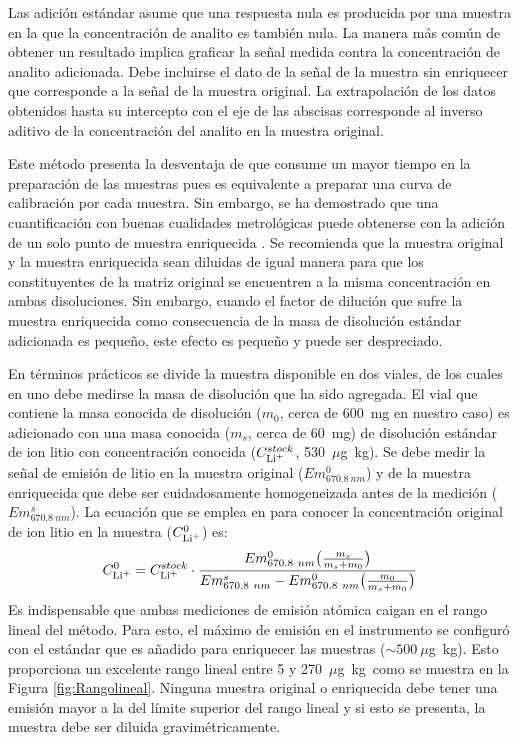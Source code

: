 Las adición estándar asume que una respuesta nula es producida por una muestra en la que la concentración de analito es también nula. La manera más común de obtener un resultado implica graficar la señal medida contra la concentración de analito adicionada. Debe incluirse el dato de la señal de la muestra sin enriquecer que corresponde a la señal de la muestra original. La extrapolación de los datos obtenidos hasta su intercepto con el eje de las abscisas corresponde al inverso aditivo de la concentración del analito en la muestra original.

Este método presenta la desventaja de que consume un mayor tiempo en la preparación de las muestras pues es equivalente a preparar una curva de calibración por cada muestra. Sin embargo, se ha demostrado que una cuantificación con buenas cualidades metrológicas puede obtenerse con la adición de un solo punto de muestra enriquecida \citep{Ellison2008}. Se recomienda que la muestra original y la muestra enriquecida sean diluidas de igual manera para que los constituyentes de la matriz original se encuentren a la misma concentración en ambas disoluciones. Sin embargo, cuando el factor de dilución que sufre la muestra enriquecida como consecuencia de la masa de disolución estándar adicionada es pequeño, este efecto es pequeño y puede ser despreciado.

En términos prácticos se divide la muestra disponible en dos viales, de los cuales en uno debe medirse la masa de disolución que ha sido agregada. El vial que contiene la masa conocida de disolución ($m_0$, cerca de 600~mg en nuestro caso) es adicionado con una masa conocida ($m_s$, cerca de 60~mg) de disolución estándar de ion litio con concentración conocida ($C_{\ce{Li+}}^{stock}$, 530~$\mu$g~kg\mnn). Se debe medir la señal de emisión de litio en la muestra original ($Em_{670.8~nm}^0$) y de la muestra enriquecida que debe ser cuidadosamente homogeneizada antes de la medición ($Em_{670.8~nm}^s$). La ecuación que se emplea en para conocer la concentración original de ion litio en la muestra ($C_{\ce{Li+}}^0$) es:
\begin{equation}
    C_{\ce{Li+}}^0 = C_{\ce{Li+}}^{stock} \cdot\frac{Em_{670.8~nm}^0  \big(\frac{m_s}{m_s+m_0}\big)} {Em_{670.8~nm}^s-Em_{670.8~nm}^0\big(\frac{m_0}{m_s+m_0}\big)}
\end{equation}
Es indispensable que ambas mediciones de emisión atómica caigan en el rango lineal del método. Para esto, el máximo de emisión en el instrumento se configuró con el estándar que es añadido para enriquecer las muestras ($\sim500~\mu$g~kg\mnn). Esto proporciona un excelente rango lineal entre 5 y 270~$\mu$g~kg\mnn\ como se muestra en la Figura \ref{fig:Rangolineal}. Ninguna muestra original o enriquecida debe tener una emisión mayor a la del límite superior del rango lineal y si esto se presenta, la muestra debe ser diluida gravimétricamente.

